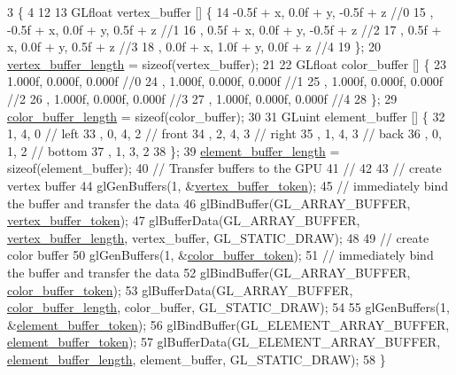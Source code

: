 \begin{DoxyCode}
3                                                           \{
4 
12 
13   GLfloat vertex\_buffer [] \{
14       -0.5f + x,  0.0f + y, -0.5f + z   \textcolor{comment}{//0}
15     , -0.5f + x,  0.0f + y,  0.5f + z   \textcolor{comment}{//1}
16     ,  0.5f + x,  0.0f + y, -0.5f + z   \textcolor{comment}{//2}
17     ,  0.5f + x,  0.0f + y,  0.5f + z   \textcolor{comment}{//3}
18     ,  0.0f + x,  1.0f + y,  0.0f + z   \textcolor{comment}{//4}
19   \};
20   \hyperlink{classPyramidAsset_a9252f29d7dc33374d43dd779db4fcce4}{vertex\_buffer\_length} = \textcolor{keyword}{sizeof}(vertex\_buffer);
21 
22   GLfloat color\_buffer [] \{
23       1.000f, 0.000f, 0.000f \textcolor{comment}{//0}
24     , 1.000f, 0.000f, 0.000f \textcolor{comment}{//1}
25     , 1.000f, 0.000f, 0.000f \textcolor{comment}{//2}
26     , 1.000f, 0.000f, 0.000f \textcolor{comment}{//3}
27     , 1.000f, 0.000f, 0.000f \textcolor{comment}{//4}
28   \};
29   \hyperlink{classPyramidAsset_ae576f67cdec51a52645131919d86a38a}{color\_buffer\_length} = \textcolor{keyword}{sizeof}(color\_buffer);
30 
31   GLuint element\_buffer []  \{
32       1, 4, 0  \textcolor{comment}{// left}
33     , 0, 4, 2  \textcolor{comment}{// front}
34     , 2, 4, 3  \textcolor{comment}{// right}
35     , 1, 4, 3  \textcolor{comment}{// back}
36     , 0, 1, 2  \textcolor{comment}{// bottom}
37     , 1, 3, 2     
38   \};
39   \hyperlink{classPyramidAsset_a5566105859271b493eab3b5f9c02f866}{element\_buffer\_length} = \textcolor{keyword}{sizeof}(element\_buffer);
40   \textcolor{comment}{// Transfer buffers to the GPU}
41   \textcolor{comment}{//}
42 
43   \textcolor{comment}{// create vertex buffer}
44   glGenBuffers(1, &\hyperlink{classPyramidAsset_a54d9cec42bc77d07a66e6c1cd55049b0}{vertex\_buffer\_token});
45   \textcolor{comment}{// immediately bind the buffer and transfer the data}
46   glBindBuffer(GL\_ARRAY\_BUFFER, \hyperlink{classPyramidAsset_a54d9cec42bc77d07a66e6c1cd55049b0}{vertex\_buffer\_token});
47   glBufferData(GL\_ARRAY\_BUFFER, \hyperlink{classPyramidAsset_a9252f29d7dc33374d43dd779db4fcce4}{vertex\_buffer\_length}, vertex\_buffer, GL\_STATIC\_DRAW);
48 
49   \textcolor{comment}{// create color buffer}
50   glGenBuffers(1, &\hyperlink{classPyramidAsset_a7a984ee57fa7deda5aedf8b1f5f85c6f}{color\_buffer\_token});
51   \textcolor{comment}{// immediately bind the buffer and transfer the data}
52   glBindBuffer(GL\_ARRAY\_BUFFER, \hyperlink{classPyramidAsset_a7a984ee57fa7deda5aedf8b1f5f85c6f}{color\_buffer\_token});
53   glBufferData(GL\_ARRAY\_BUFFER, \hyperlink{classPyramidAsset_ae576f67cdec51a52645131919d86a38a}{color\_buffer\_length}, color\_buffer, GL\_STATIC\_DRAW);
54   
55   glGenBuffers(1, &\hyperlink{classPyramidAsset_a6f7e2f50904d2941e33df8eb7f5f9c2d}{element\_buffer\_token});
56   glBindBuffer(GL\_ELEMENT\_ARRAY\_BUFFER, \hyperlink{classPyramidAsset_a6f7e2f50904d2941e33df8eb7f5f9c2d}{element\_buffer\_token});
57   glBufferData(GL\_ELEMENT\_ARRAY\_BUFFER, \hyperlink{classPyramidAsset_a5566105859271b493eab3b5f9c02f866}{element\_buffer\_length}, element\_buffer, 
      GL\_STATIC\_DRAW);
58 \}
\end{DoxyCode}
